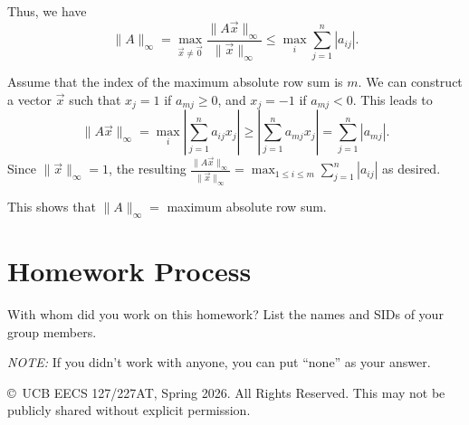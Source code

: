 \documentclass[10pt]{article}
\theoremstyle{definition}
\theoremstyle{plain}
\begin{document}
\begin{enumerate}[label=(\alph*)]
Thus, we have
\begin{equation}
\|A\|_\infty = \max_{\vec{x} \neq \vec{0}} \frac{\|A\vec{x}\|_\infty}{\|\vec{x}\|_\infty} \le \max_i \sum_{j=1}^{n} |a_{ij}|.
\end{equation}

Assume that the index of the maximum absolute row sum is $m$. We can construct a vector $\vec{x}$ such that $x_j = 1$ if $a_{mj} \ge 0$, and $x_j = -1$ if $a_{mj} < 0$. This leads to
\begin{equation}
\|A\vec{x}\|_\infty = \max_i \left|\sum_{j=1}^{n} a_{ij} x_j\right| \ge \left|\sum_{j=1}^{n} a_{mj} x_j\right| = \sum_{j=1}^{n} |a_{mj}|.
\end{equation}
Since $\|\vec{x}\|_\infty = 1$, the resulting $\frac{\|A\vec{x}\|_\infty}{\|\vec{x}\|_\infty} = \max_{1 \le i \le m} \sum_{j=1}^{n} |a_{ij}|$ as desired.

This shows that $\|A\|_\infty = $ maximum absolute row sum.
\end{enumerate}

\newpage

\section{Homework Process}

With whom did you work on this homework? List the names and SIDs of your group members.

\textit{NOTE:} If you didn't work with anyone, you can put ``none'' as your answer.

\vfill
\begin{center}
\small \copyright\ UCB EECS 127/227AT, Spring 2026. All Rights Reserved. This may not be publicly shared without explicit permission.
\end{center}
\end{document}
